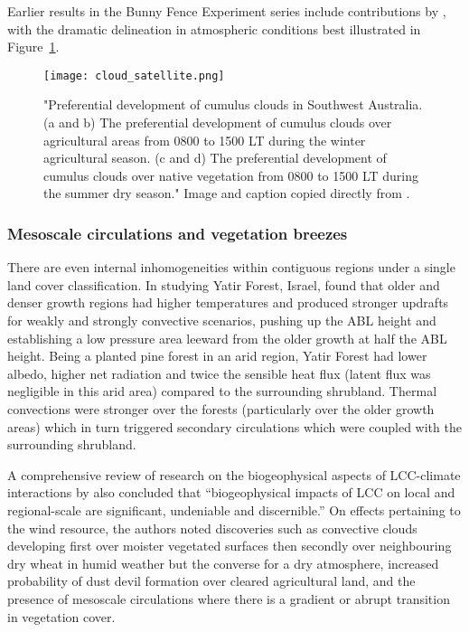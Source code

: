 Earlier results in the Bunny Fence Experiment series include contributions by \citet{lyons1993, lyons1996, lyons2001, lyons2002, ray2003}, with the dramatic delineation in atmospheric conditions best illustrated in Figure~\ref{fig:cloud_satellite}.

\begin{figure}[!ht]
	\centering
	\texttt{[image: cloud\_satellite.png]}
	\caption[Satellite image of delineated cumulus development along fence]{"Preferential development of cumulus clouds in Southwest Australia. (a and b) The preferential development of cumulus clouds over agricultural areas from 0800 to 1500 LT during the winter agricultural season. (c and d) The preferential development of cumulus clouds over native vegetation from 0800 to 1500 LT during the summer dry season." Image and caption copied directly from \citet{ray2003}.}
	\label{fig:cloud_satellite}
\end{figure}

\subsubsection{Mesoscale circulations and vegetation breezes}

There are even internal inhomogeneities within contiguous regions under a single land cover classification. In studying Yatir Forest, Israel, \citet{kroniger2018} found that older and denser growth regions had higher temperatures and produced stronger updrafts for weakly and strongly convective scenarios, pushing up the ABL height and establishing a low pressure area leeward from the older growth at half the ABL height. Being a planted pine forest in an arid region, Yatir Forest had lower albedo, higher net radiation and twice the sensible heat flux (latent flux was negligible in this arid area) compared to the surrounding shrubland. Thermal convections were stronger over the forests (particularly over the older growth areas) which in turn triggered secondary circulations which were coupled with the surrounding shrubland.

A comprehensive review of research on the biogeophysical aspects of \ac{LCC}-climate interactions by \citet{mahmood2014} also concluded that “biogeophysical impacts of \ac{LCC} on local and regional-scale are significant, undeniable and discernible.” On effects pertaining to the wind resource, the authors noted discoveries such as convective clouds developing first over moister vegetated surfaces then secondly over neighbouring dry wheat in humid weather but the converse for a dry atmosphere, increased probability of dust devil formation over cleared agricultural land, and the presence of mesoscale circulations where there is a gradient or abrupt transition in vegetation cover.

